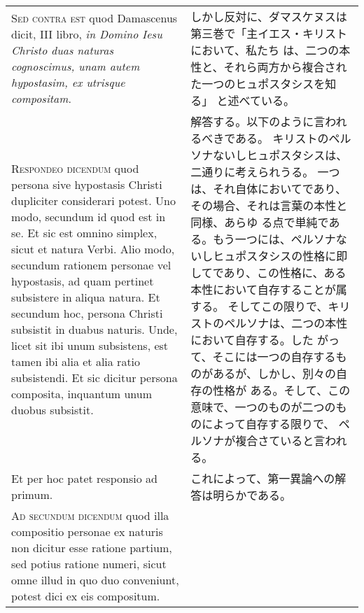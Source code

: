 \documentclass[10pt]{jsarticle} %
\begin{document}
\begin{longtable}{p{21em}p{21em}}
\\



{\scshape Sed contra est} quod Damascenus dicit, III libro, {\itshape in Domino Iesu Christo
duas naturas cognoscimus, unam autem hypostasim, ex utrisque compositam}.


&

しかし反対に、ダマスケヌスは第三巻で「主イエス・キリストにおいて、私たち
 は、二つの本性と、それら両方から複合された一つのヒュポスタシスを知る」
 と述べている。

\\



{\scshape Respondeo dicendum} quod persona sive hypostasis Christi dupliciter
considerari potest. Uno modo, secundum id quod est in se. Et sic est
omnino simplex, sicut et natura Verbi. Alio modo, secundum rationem
personae vel hypostasis, ad quam pertinet subsistere in aliqua
natura. Et secundum hoc, persona Christi subsistit in duabus
naturis. Unde, licet sit ibi unum subsistens, est tamen ibi alia et alia
ratio subsistendi. Et sic dicitur persona composita, inquantum unum
duobus subsistit.


&

解答する。以下のように言われるべきである。
キリストのペルソナないしヒュポスタシスは、二通りに考えられうる。
一つは、それ自体においてであり、その場合、それは言葉の本性と同様、あらゆ
 る点で単純である。もう一つには、ペルソナないしヒュポスタシスの性格に即
 してであり、この性格に、ある本性において自存することが属する。
そしてこの限りで、キリストのペルソナは、二つの本性において自存する。した
 がって、そこには一つの自存するものがあるが、しかし、別々の自存の性格が
 ある。そして、この意味で、一つのものが二つのものによって自存する限りで、
 ペルソナが複合さていると言われる。

\\



Et per hoc patet responsio ad primum.


&

これによって、第一異論への解答は明らかである。

\\



{\scshape Ad secundum dicendum} quod illa compositio personae ex naturis non
dicitur esse ratione partium, sed potius ratione numeri, sicut omne
illud in quo duo conveniunt, potest dici ex eis compositum.



\end{longtable}
\end{document}
